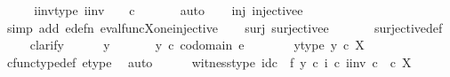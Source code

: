 \begin{isabellebody}
\ \ \isamarkupfalse%
\ \isamarkupfalse%
\ i{\isacharunderscore}{\kern0pt}inv{\isacharunderscore}{\kern0pt}type{\isacharcolon}{\kern0pt}\ {\isachardoublequoteopen}i{\isacharunderscore}{\kern0pt}inv{\isacharcolon}{\kern0pt}\ {\isasymone}{\isasymrightarrow}\ \ {\isasymone}\ {\isasymtimes}\isactrlsub c\ {\isasymone}{\isachardoublequoteclose}\isanewline
\ \ \ \ \isamarkupfalse%
\ auto\isanewline
\isanewline
\ \ \isamarkupfalse%
\ inj{\isacharcolon}{\kern0pt}\ {\isachardoublequoteopen}injective{\isacharparenleft}{\kern0pt}e{\isacharparenright}{\kern0pt}{\isachardoublequoteclose}\isanewline
\ \ \ \ \isamarkupfalse%
\ {\isacharparenleft}{\kern0pt}simp\ add{\isacharcolon}{\kern0pt}\ e{\isacharunderscore}{\kern0pt}defn\ eval{\isacharunderscore}{\kern0pt}func{\isacharunderscore}{\kern0pt}X{\isacharunderscore}{\kern0pt}one{\isacharunderscore}{\kern0pt}injective{\isacharparenright}{\kern0pt}\isanewline
\isanewline
\ \ \isamarkupfalse%
\ surj{\isacharcolon}{\kern0pt}\ {\isachardoublequoteopen}surjective{\isacharparenleft}{\kern0pt}e{\isacharparenright}{\kern0pt}{\isachardoublequoteclose}\isanewline
\ \ \ \ \ \isamarkupfalse%
\ surjective{\isacharunderscore}{\kern0pt}def\isanewline
\ \ \ \isamarkupfalse%
\ clarify\isanewline
\ \ \ \ \isamarkupfalse%
\ y\ \isanewline
\ \ \ \ \isamarkupfalse%
\ {\isachardoublequoteopen}y\ {\isasymin}\isactrlsub c\ codomain\ e{\isachardoublequoteclose}\isanewline
\ \ \ \ \isamarkupfalse%
\ \isamarkupfalse%
\ y{\isacharunderscore}{\kern0pt}type{\isacharcolon}{\kern0pt}\ {\isachardoublequoteopen}y\ {\isasymin}\isactrlsub c\ X{\isachardoublequoteclose}\isanewline
\ \ \ \ \ \ \isamarkupfalse%
\ cfunc{\isacharunderscore}{\kern0pt}type{\isacharunderscore}{\kern0pt}def\ e{\isacharunderscore}{\kern0pt}type\ \isamarkupfalse%
\ auto\isanewline
\isanewline
\ \ \ \ \isamarkupfalse%
\ witness{\isacharunderscore}{\kern0pt}type{\isacharcolon}{\kern0pt}\ {\isachardoublequoteopen}{\isacharparenleft}{\kern0pt}id\isactrlsub c\ {\isasymone}\ {\isasymtimes}\isactrlsub f\ {\isacharparenleft}{\kern0pt}y\ {\isasymcirc}\isactrlsub c\ i{\isacharparenright}{\kern0pt}\isactrlsup {\isasymsharp}{\isacharparenright}{\kern0pt}\ {\isasymcirc}\isactrlsub c\ i{\isacharunderscore}{\kern0pt}inv\ {\isasymin}\isactrlsub c\ {\isasymone}\ {\isasymtimes}\isactrlsub c\ X\isactrlbsup {\isasymone}\isactrlesup {\isachardoublequoteclose}\isanewline

\end{isabellebody}
